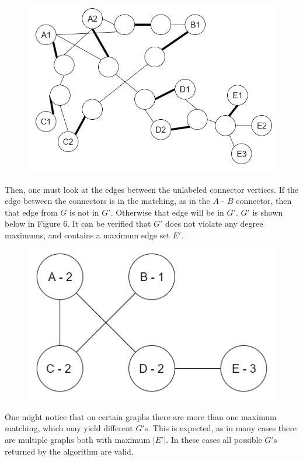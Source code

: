 \documentclass{article}
\begin{document}
		\begin{figure}[H]
		\caption{}
		\includegraphics{Figure5}
	\end{figure}
	Then, one must look at the edges between the unlabeled connector vertices. If the edge between the connectors is in the matching, as in the $A$ - $B$ connector, then that edge from $G$ is not in $G'$. Otherwise that edge will be in $G'$. $G'$ is shown below in Figure 6. It can be verified that $G'$ does not violate any degree maximums, and contains a maximum edge set $E'$.
	\begin{figure}[H]
		\caption{}
		\includegraphics{Figure6}
	\end{figure}

	One might notice that on certain graphs there are more than one maximum matching, which may yield different $G'$s. This is expected, as in many cases there are multiple graphs both with maximum $|E'|$. In these cases all possible $G'$s returned by the algorithm are valid.

	\newtheorem{theorem}{Theorem}
\end{document}
